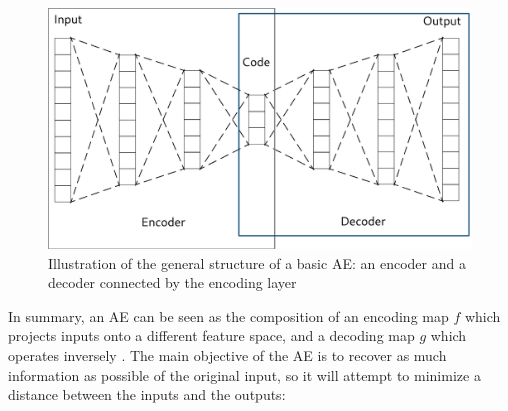 \begin{figure}[ht]
    \centering
    \includegraphics[width=\linewidth]{autoencoder.png}
    \caption{Illustration of the general structure of a basic AE: an encoder and a decoder connected by the encoding layer}
    \label{fig:ae}
\end{figure}

\begin{table}[ht]\centering
    \caption{}
\end{table}

In summary, an AE can be seen as the composition of an encoding map $f$ which projects inputs onto a different feature space, and a decoding map $g$ which operates inversely . The main objective of the AE is to recover as much information as possible of the original input, so it will attempt to minimize a distance between the inputs and the outputs:

